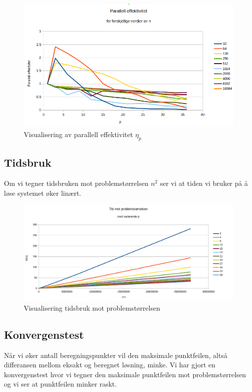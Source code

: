 \documentclass[11pt,norsk,a4paper]{article}
\begin{document}
\begin{figure}[h]
\centering
\includegraphics[scale=0.5]{plot_parallell.png}
\caption{Visualisering av parallell effektivitet $\eta_p$}
\end{figure}

\subsection{Tidsbruk}

Om vi tegner tidsbruken mot problemstørrelsen $n^2$ ser vi at tiden vi bruker på å løse systemet øker linært. 

\begin{figure}[h]
\centering
\includegraphics[scale=0.4]{plot_tid_p.png}
\caption{Visualisering tidsbruk mot problemstørrelsen}
\end{figure}



\subsection{Konvergenstest}
Når vi øker antall beregningspunkter vil den maksimale punktfeilen, altså differansen mellom eksakt og beregnet løsning, minke. Vi har gjort en konvergenstest hvor vi tegner den maksimale punktfeilen mot problemstørrelsen og vi ser at punktfeilen minker raskt.
\end{document}
